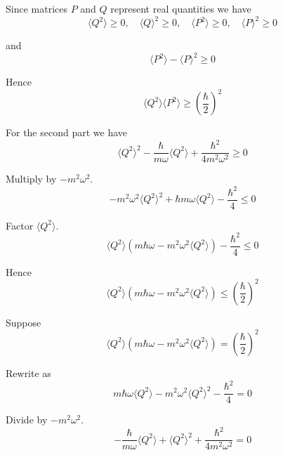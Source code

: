Since matrices $P$ and $Q$ represent real quantities we have
\begin{equation*}
\langle Q^2\rangle\ge0,\quad\langle Q\rangle^2\ge0,\quad
\langle P^2\rangle\ge0,\quad\langle P\rangle^2\ge0
\end{equation*}

and
\begin{equation*}
\langle P^2\rangle-\langle P\rangle^2\ge0
\end{equation*}

Hence
\begin{equation*}
\langle Q^2\rangle\langle P^2\rangle\ge\left(\frac{\hbar}{2}\right)^2\tag{1}
\end{equation*}

For the second part we have
\begin{equation*}
\langle Q^2\rangle^2-\frac{\hbar}{m\omega}\langle Q^2\rangle+\frac{\hbar^2}{4m^2\omega^2}\ge0
\end{equation*}

Multiply by $-m^2\omega^2$.
\begin{equation*}
-m^2\omega^2\langle Q^2\rangle^2+\hbar m\omega\langle Q^2\rangle-\frac{\hbar^2}{4}\le0
\end{equation*}

Factor $\langle Q^2\rangle$.
\begin{equation*}
\langle Q^2\rangle\left(m\hbar\omega-m^2\omega^2\langle Q^2\rangle\right)-\frac{\hbar^2}{4}\le0
\end{equation*}

Hence
\begin{equation*}
\langle Q^2\rangle\left(m\hbar\omega-m^2\omega^2\langle Q^2\rangle\right)\le\left(\frac{\hbar}{2}\right)^2
\tag{2}
\end{equation*}

Suppose
\begin{equation*}
\langle Q^2\rangle\left(m\hbar\omega-m^2\omega^2\langle Q^2\rangle\right)=\left(\frac{\hbar}{2}\right)^2
\end{equation*}

Rewrite as
\begin{equation*}
m\hbar\omega\langle Q^2\rangle-m^2\omega^2\langle Q^2\rangle^2-\frac{\hbar^2}{4}=0
\end{equation*}

Divide by $-m^2\omega^2$.
\begin{equation*}
-\frac{\hbar}{m\omega}\langle Q^2\rangle+\langle Q^2\rangle^2+\frac{\hbar^2}{4m^2\omega^2}=0
\end{equation*}

